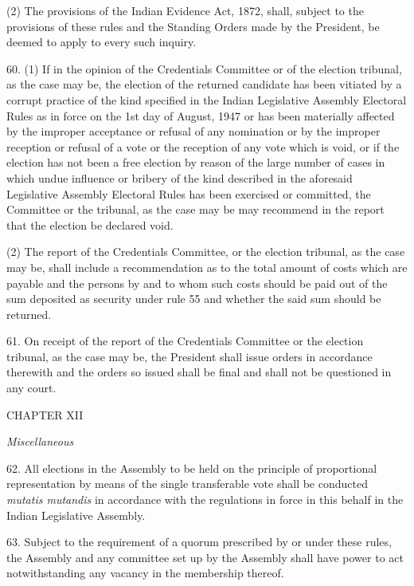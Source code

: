 (2) The provisions of the Indian Evidence Act, 1872, shall, subject to the provisions of these rules and the Standing Orders made by the President, be deemed to apply to every such inquiry.



60. (1) If in the opinion of the Credentials Committee or of the election tribunal, as the case may be, the election of the returned candidate has been vitiated by a corrupt practice of the kind specified in the Indian Legislative Assembly Electoral Rules as in force on the 1st day of August, 1947 or has been materially affected by the improper acceptance or refusal of any nomination or by the improper reception or refusal of a vote or the reception of any vote which is void, or if the election has not been a free election by reason of the large number of cases in which undue influence or bribery of the kind described in the aforesaid Legislative Assembly Electoral Rules has been exercised or committed, the Committee or the tribunal, as the case may be may recommend in the report that the election be declared void.



(2) The report of the Credentials Committee, or the election tribunal, as the case may be, shall include a recommendation as to the total amount of costs which are payable and the persons by and to whom such costs should be paid out of the sum deposited as security under rule 55 and whether the said sum should be returned.



61. On receipt of the report of the Credentials Committee or the election tribunal, as the case may be, the President shall issue orders in accordance therewith and the orders so issued shall be final and shall not be questioned in any court.



\begin{center}
CHAPTER XII\end{center}
\begin{center}
\emph{Miscellaneous}\end{center}


62. All elections in the Assembly to be held on the principle of proportional representation by means of the single transferable vote shall be conducted \emph{mutatis mutandis} in accordance with the regulations in force in this behalf in the Indian Legislative Assembly.



63. Subject to the requirement of a quorum prescribed by or under these rules, the Assembly and any committee set up by the Assembly shall have power to act notwithstanding any vacancy in the membership thereof.



